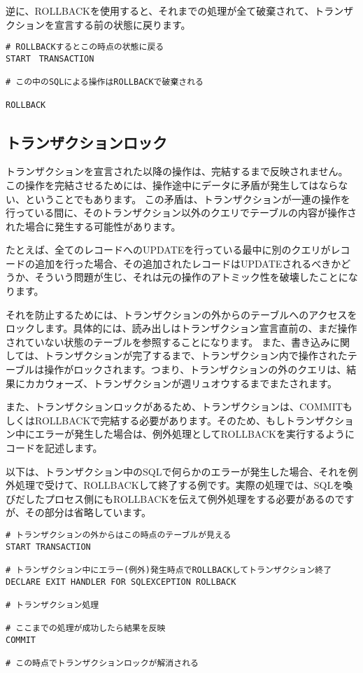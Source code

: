 逆に、ROLLBACKを使用すると、それまでの処理が全て破棄されて、トランザクションを宣言する前の状態に戻ります。

\begin{verbatim}
# ROLLBACKするとこの時点の状態に戻る
START　TRANSACTION

# この中のSQLによる操作はROLLBACKで破棄される

ROLLBACK
\end{verbatim}

\subsection{トランザクションロック}
トランザクションを宣言された以降の操作は、完結するまで反映されません。
この操作を完結させるためには、操作途中にデータに矛盾が発生してはならない、ということでもあります。
この矛盾は、トランザクションが一連の操作を行っている間に、そのトランザクション以外のクエリでテーブルの内容が操作された場合に発生する可能性があります。

たとえば、全てのレコードへのUPDATEを行っている最中に別のクエリがレコードの追加を行った場合、その追加されたレコードはUPDATEされるべきかどうか、そういう問題が生じ、それは元の操作のアトミック性を破壊したことになります。

それを防止するためには、トランザクションの外からのテーブルへのアクセスをロックします。具体的には、読み出しはトランザクション宣言直前の、まだ操作されていない状態のテーブルを参照することになります。
また、書き込みに関しては、トランザクションが完了するまで、トランザクション内で操作されたテーブルは操作がロックされます。つまり、トランザクションの外のクエリは、結果にカカウォーズ、トランザクションが週リュオウするまでまたされます。

また、トランザクションロックがあるため、トランザクションは、COMMITもしくはROLLBACKで完結する必要があります。そのため、もしトランザクション中にエラーが発生した場合は、例外処理としてROLLBACKを実行するようにコードを記述します。

以下は、トランザクション中のSQLで何らかのエラーが発生した場合、それを例外処理で受けて、ROLLBACKして終了する例です。実際の処理では、SQLを喚びだしたプロセス側にもROLLBACKを伝えて例外処理をする必要があるのですが、その部分は省略しています。

\begin{verbatim}
# トランザクションの外からはこの時点のテーブルが見える
START TRANSACTION

# トランザクション中にエラー(例外)発生時点でROLLBACKしてトランザクション終了
DECLARE EXIT HANDLER FOR SQLEXCEPTION ROLLBACK

# トランザクション処理

# ここまでの処理が成功したら結果を反映
COMMIT

# この時点でトランザクションロックが解消される

\end{verbatim}